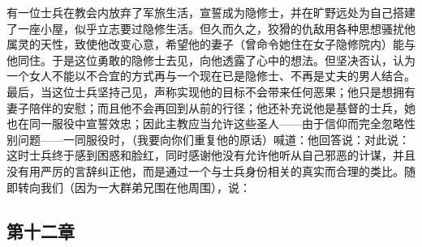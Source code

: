 有一位士兵在教会内放弃了军旅生活，宣誓成为隐修士，并在旷野远处为自己搭建了一座小屋，似乎立志要过隐修生活。但久而久之，狡猾的仇敌用各种思想骚扰他属灵的天性，致使他改变心意，希望他的妻子（曾命令她住在女子隐修院内）能与他同住。于是这位勇敢的隐修士去见，向他透露了心中的想法。但坚决否认，认为一个女人不能以不合宜的方式再与一个现在已是隐修士、不再是丈夫的男人结合。最后，当这位士兵坚持己见，声称实现他的目标不会带来任何恶果；他只是想拥有妻子陪伴的安慰；而且他不会再回到从前的行径；他还补充说他是基督的士兵，她也在同一服役中宣誓效忠；因此主教应当允许这些圣人——由于信仰而完全忽略性别问题——一同服役时，（我要向你们重复他的原话）喊道：他回答说：对此说：这时士兵终于感到困惑和脸红，同时感谢他没有允许他听从自己邪恶的计谋，并且没有用严厉的言辞纠正他，而是通过一个与士兵身份相关的真实而合理的类比。随即转向我们（因为一大群弟兄围在他周围），说：\par


\subsection{第十二章}

